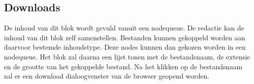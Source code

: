 \subsection{Downloads}
\label{sec:Downloads}
De inhoud van dit blok wordt gevuld vanuit een nodequeue. De redactie kan de inhoud van dit blok zelf samenstellen. Bestanden kunnen gekoppeld worden aan daarvoor bestemde inhoudstype. Deze nodes kunnen dan gekozen worden in een nodequeue. Het blok zal daarna een lijst tonen met de bestandsnaam, de extensie en de grootte van het gekoppelde bestand. Na het klikken op de bestandsnaam zal er een download dialoogvenster van de browser geopend worden.